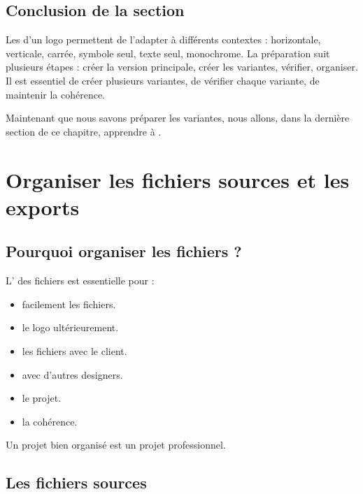 \subsection*{Conclusion de la section}

Les  d'un logo permettent de l'adapter à différents contextes : horizontale, verticale, carrée, symbole seul, texte seul, monochrome. La préparation suit plusieurs étapes : créer la version principale, créer les variantes, vérifier, organiser. Il est essentiel de créer plusieurs variantes, de vérifier chaque variante, de maintenir la cohérence.

Maintenant que nous savons préparer les variantes, nous allons, dans la dernière section de ce chapitre, apprendre à .

\section{Organiser les fichiers sources et les exports}

\subsection{Pourquoi organiser les fichiers ?}

L' des fichiers est essentielle pour :

\begin{itemize}
    \item {} facilement les fichiers.
    \item {} le logo ultérieurement.
    \item {} les fichiers avec le client.
    \item {} avec d'autres designers.
    \item {} le projet.
    \item {} la cohérence.
\end{itemize}

Un projet bien organisé est un projet professionnel.

\subsection{Les fichiers sources}

